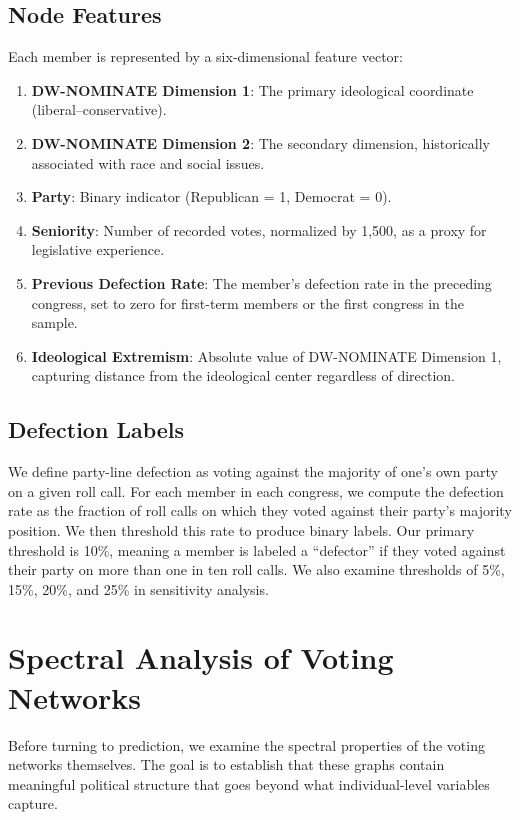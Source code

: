 \documentclass[11pt]{article}
\begin{document}
\subsection{Node Features}

Each member is represented by a six-dimensional feature vector:
\begin{enumerate}
    \item \textbf{DW-NOMINATE Dimension 1}: The primary ideological coordinate (liberal--conservative).
    \item \textbf{DW-NOMINATE Dimension 2}: The secondary dimension, historically associated with race and social issues.
    \item \textbf{Party}: Binary indicator (Republican = 1, Democrat = 0).
    \item \textbf{Seniority}: Number of recorded votes, normalized by 1,500, as a proxy for legislative experience.
    \item \textbf{Previous Defection Rate}: The member's defection rate in the preceding congress, set to zero for first-term members or the first congress in the sample.
    \item \textbf{Ideological Extremism}: Absolute value of DW-NOMINATE Dimension 1, capturing distance from the ideological center regardless of direction.
\end{enumerate}

\subsection{Defection Labels}

We define party-line defection as voting against the majority of one's own party on a given roll call. For each member in each congress, we compute the defection rate as the fraction of roll calls on which they voted against their party's majority position. We then threshold this rate to produce binary labels. Our primary threshold is 10\%, meaning a member is labeled a ``defector'' if they voted against their party on more than one in ten roll calls. We also examine thresholds of 5\%, 15\%, 20\%, and 25\% in sensitivity analysis.

\section{Spectral Analysis of Voting Networks}
\label{sec:spectral}

Before turning to prediction, we examine the spectral properties of the voting networks themselves. The goal is to establish that these graphs contain meaningful political structure that goes beyond what individual-level variables capture.
\end{document}
